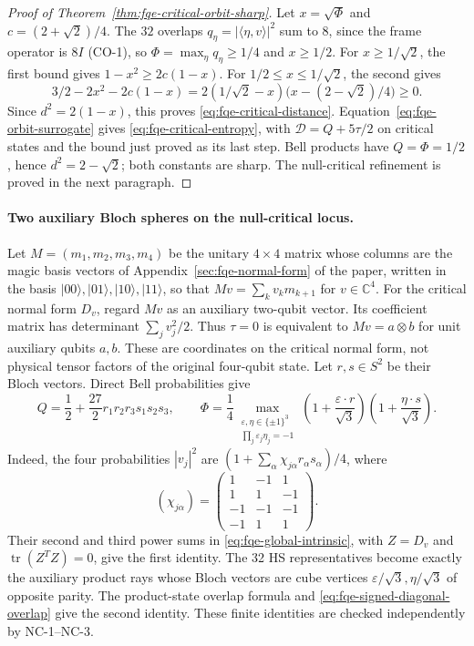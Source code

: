 \begin{proof}[Proof of Theorem~\ref{thm:fqe-critical-orbit-sharp}]
Let $x=\sqrt{\Phi}$ and $c=(2+\sqrt2)/4$. The $32$ overlaps
$q_\eta=|\langle\eta,v\rangle|^2$ sum to $8$, since the frame operator is $8I$ (CO-1), so
$\Phi=\max_\eta q_\eta\ge1/4$ and $x\ge1/2$.
For $x\ge1/\sqrt2$, the first bound gives
$1-x^2\ge2c(1-x)$. For $1/2\le x\le1/\sqrt2$, the second gives
\[
 3/2-2x^2-2c(1-x)
 =2(1/\sqrt2-x)\bigl(x-(2-\sqrt2)/4\bigr)\ge0.
\]
Since $d^2=2(1-x)$, this proves \eqref{eq:fqe-critical-distance}.
Equation~\eqref{eq:fqe-orbit-surrogate} gives \eqref{eq:fqe-critical-entropy}, with
$\mathcal D=Q+5\tau/2$ on critical states and the bound just proved as its last step. Bell products have
$Q=\Phi=1/2$, hence $d^2=2-\sqrt2$; both constants are sharp.
The null-critical refinement is proved in the next paragraph.
\end{proof}

\paragraph{Two auxiliary Bloch spheres on the null-critical locus.}
Let $M=(m_1,m_2,m_3,m_4)$ be the unitary $4\times4$ matrix whose columns are the magic basis vectors of
Appendix~\ref{sec:fqe-normal-form} of the paper, written in the basis
$|00\rangle,|01\rangle,|10\rangle,|11\rangle$, so that $Mv=\sum_kv_km_{k+1}$ for $v\in\mathbb C^4$. For the critical
normal form $D_v$, regard $Mv$ as an auxiliary two-qubit vector.
Its coefficient matrix has determinant $\sum_jv_j^2/2$.
Thus $\tau=0$ is equivalent to $Mv=a\otimes b$ for unit auxiliary
qubits $a,b$. These are coordinates on the critical normal form, not
physical tensor factors of the original four-qubit state.
Let $r,s\in S^2$ be their Bloch vectors. Direct Bell probabilities give
\begin{equation}\label{eq:fqe-null-critical-bloch}
 Q=\frac12+\frac{27}{2}r_1r_2r_3s_1s_2s_3,\qquad
 \Phi=\frac14\max_{\substack{\varepsilon,\eta\in\{\pm1\}^3\\
                         \prod_j\varepsilon_j\eta_j=-1}}
 \left(1+\frac{\varepsilon\cdot r}{\sqrt3}\right)
 \left(1+\frac{\eta\cdot s}{\sqrt3}\right).
\end{equation}
Indeed, the four probabilities $|v_j|^2$ are
$(1+\sum_\alpha\chi_{j\alpha}r_\alpha s_\alpha)/4$, where
\[
 (\chi_{j\alpha})=
 \begin{pmatrix}1&-1&1\\1&1&-1\\-1&-1&-1\\-1&1&1\end{pmatrix}.
\]
Their second and third power sums in
\eqref{eq:fqe-global-intrinsic}, with $Z=D_v$ and $\operatorname{tr}(Z^TZ)=0$, give
the first identity. The 32 HS representatives become exactly the
auxiliary product rays whose Bloch vectors are cube vertices
$\varepsilon/\sqrt3,\eta/\sqrt3$ of opposite parity. The product-state
overlap formula and \eqref{eq:fqe-signed-diagonal-overlap} give the second
identity. These finite identities are checked independently by NC-1--NC-3.

